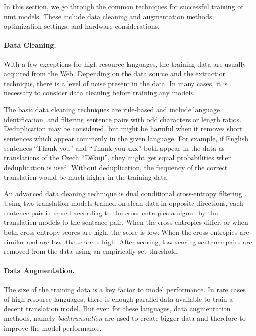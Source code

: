 In this section, we go through the common techniques for successful training of
\gls{nmt} models. These include data cleaning and augmentation methods,
optimization settings, and hardware considerations.

\paragraph{Data Cleaning.} With a few exceptions for high-resource languages,
the training data are usually acquired from the Web. Depending on the data
source and the extraction technique, there is a level of noise present in the
data. In many cases, it is necessary to consider data cleaning before training
any models.

The basic data cleaning techniques are rule-based and include language
identification, and filtering sentence pairs with odd characters or length
ratios. Deduplication may be considered, but might be harmful when it removes
short sentences which appear commonly in the given language. For example, if
English sentences ``Thank you'' and ``Thank you xxx'' both appear in the data
as translations of the Czech ``Děkuji'', they might get equal probabilities
when deduplication is used. Without deduplication, the frequency of the correct
translation would be much higher in the training data.

An advanced data cleaning technique is dual conditional cross-entropy filtering
\citep{junczys-dowmunt-2018-dual}. Using two translation models trained on
clean data in opposite directions, each sentence pair is scored according to
the cross entropies assigned by the translation models to the sentence
pair. When the cross entropies differ, or when both cross entropy scores are
high, the score is low. When the cross entropies are similar and are low, the
score is high. After scoring, low-scoring sentence pairs are removed from the
data using an empirically set threshold.

\paragraph{Data Augmentation.} The size of the training data is a key factor to
model performance. In rare cases of high-resource languages, there is enough
parallel data available to train a decent translation model. But even for these
languages, data augmentation methods, namely \emph{backtranslation} are used
to create bigger data and therefore to improve the model performance.

